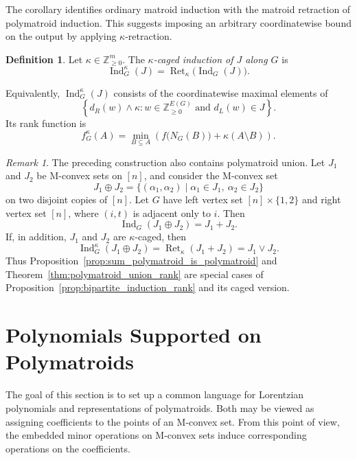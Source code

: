 \documentclass[11pt]{article}
\theoremstyle{definition}
\newtheorem{definition}[theorem]{Definition}
\theoremstyle{remark}
\newtheorem{remark}[theorem]{Remark}
\DeclareMathOperator{\Ret}{Ret}                %
\begin{document}
The corollary identifies ordinary matroid induction with the matroid
retraction of polymatroid induction. This suggests imposing an
arbitrary coordinatewise bound on the output by applying
$\kappa$-retraction.

\begin{definition}
    Let $\kappa\in\mathbb{Z}_{\geq 0}^m$. The \emph{$\kappa$-caged induction of $J$ along $G$} is
    \[
        \operatorname{Ind}_G^\kappa(J)
        =
        \Ret_\kappa\bigl(\operatorname{Ind}_G(J)\bigr).
    \]
\end{definition}

Equivalently, $\operatorname{Ind}_G^\kappa(J)$ consists of the coordinatewise maximal elements of
\[
    \left\{
        d_R(w)\wedge\kappa:
        w\in\mathbb{Z}_{\geq 0}^{E(G)}
        \text{ and }
        d_L(w)\in J
    \right\}.
\]
Its rank function is
\[
    f_G^\kappa(A)
    =
    \min_{B\subseteq A}
    \left(
        f\bigl(N_G(B)\bigr)
        +
        \kappa(A\setminus B)
    \right).
\]
\begin{remark}
    The preceding construction also contains polymatroid union. Let $J_1$ and $J_2$ be M-convex sets on $[n]$, and consider the M-convex set
    \[
        J_1\oplus J_2
        =
        \{(\alpha_1,\alpha_2)\mid
        \alpha_1\in J_1,\ \alpha_2\in J_2\}
    \]
    on two disjoint copies of $[n]$. Let $G$ have left vertex set
    $[n]\times\{1,2\}$ and right vertex set $[n]$, where $(i,t)$ is
    adjacent only to $i$. Then
    \[
        \operatorname{Ind}_G(J_1\oplus J_2)=J_1+J_2.
    \]
    If, in addition, $J_1$ and $J_2$ are $\kappa$-caged, then
    \[
        \operatorname{Ind}_G^\kappa(J_1\oplus J_2)
        =
        \Ret_\kappa(J_1+J_2)
        =
        J_1\vee J_2.
    \]
    Thus Proposition~\ref{prop:sum_polymatroid_is_polymatroid} and
    Theorem~\ref{thm:polymatroid_union_rank} are special cases of
    Proposition~\ref{prop:bipartite_induction_rank} and its caged version.
\end{remark}

\section{Polynomials Supported on Polymatroids}\label{section:polynomials_supported_on_polymatroids}

The goal of this section is to set up a common language for Lorentzian polynomials and representations of polymatroids. Both may be viewed as assigning coefficients to the points of an M-convex set. From this point of view, the embedded minor operations on M-convex sets induce corresponding operations on the coefficients.
\end{document}
